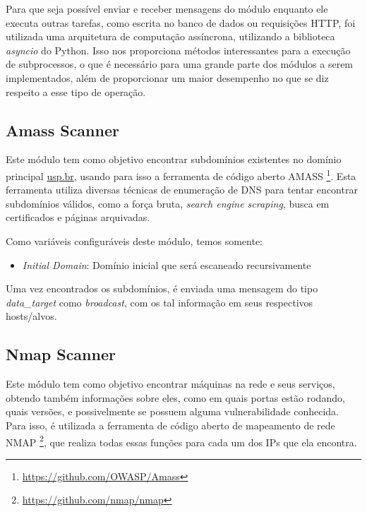     Para que seja possível enviar e receber mensagens do módulo enquanto ele executa outras tarefas, como escrita no banco de dados ou requisições HTTP, foi utilizada uma arquitetura de computação assíncrona, utilizando a biblioteca \textit{asyncio} do Python. Isso nos proporciona métodos interessantes para a execução de subprocessos, o que é necessário para uma grande parte dos módulos a serem implementados, além de proporcionar um maior desempenho no que se diz respeito a esse tipo de operação. 

    \subsection{Amass Scanner}
    
    Este módulo tem como objetivo encontrar subdomínios existentes no domínio principal \url{usp.br}, usando para isso a ferramenta de código aberto AMASS \footnote{\url{https://github.com/OWASP/Amass}}. Esta ferramenta utiliza diversas técnicas de enumeração de DNS para tentar encontrar subdomínios válidos, como a força bruta, \textit{search engine scraping}, busca em certificados e páginas arquivadas.
    
    Como variáveis configuráveis deste módulo, temos somente:
    \begin{itemize}
    \item \emph{Initial Domain}: Domínio inicial que será escaneado recursivamente
    \end{itemize}
    
    Uma vez encontrados os subdomínios, é enviada uma mensagem do tipo \textit{data\_target} como \textit{broadcast}, com os tal informação em seus respectivos hosts/alvos.
    
    \subsection{Nmap Scanner}
    Este módulo tem como objetivo encontrar máquinas na rede e seus serviços, obtendo também informações sobre eles, como em quais portas estão rodando, quais versões, e possivelmente se possuem alguma vulnerabilidade conhecida. Para isso, é utilizada a ferramenta de código aberto de mapeamento de rede NMAP \footnote{\url{https://github.com/nmap/nmap}}, que realiza todas essas funções para cada um dos IPs que ela encontra.
    
